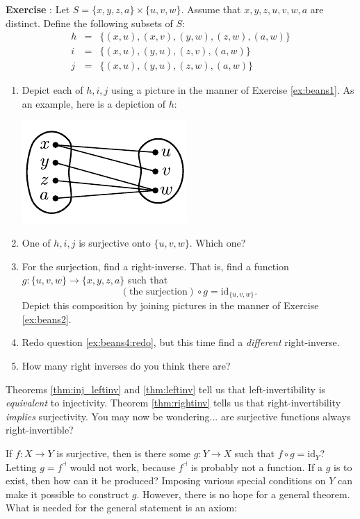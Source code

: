 \documentclass[12pt]{article}
\newcommand{\rev}[1]{{#1}^{\dashv}}
\newcommand{\id}[1]{\textrm{id}_{#1}}
\newcounter{exercise}
\newcounter{theorem}
\def\putExerciseHeading{\refstepcounter{exercise} \textbf{Exercise \theexercise}}
\newcommand{\ex}[1]{ \putExerciseHeading: #1}
\begin{document}
\ex{\label{ex:beans4}Let
$S=\{x,y,z,a\}\times\{u,v,w\}$.
Assume that $x,y,z,u,v,w,a$ are distinct.
Define the following subsets of $S$:
$$\begin{array}{lll}
h&=&\{
(x,u),(x,v),(y,w),(z,w),(a,w)
\}\\
i&=&\{
(x,u),(y,u),(z,v),(a,w)
\}\\
j&=&\{
(x,u),(y,u),(z,w),(a,w)
\}
\end{array}$$
\begin{enumerate}
\item Depict each of $h,i,j$ using a picture in the manner of Exercise \ref{ex:beans1}.
As an example, here is a depiction of $h$:
\begin{center}
\includegraphics[scale=1]{img/beans/beans6.pdf}
\end{center}
\item One of $h,i,j$ is surjective onto $\{u,v,w\}$.
Which one?
\item\label{ex:beans4:redo}
For the surjection, find a right-inverse.
That is, find a function $g:\{u,v,w\}\rightarrow\{x,y,z,a\}$ such that
$$ (\text{the surjection})\circ g = \id{\{u,v,w\}}. $$
Depict this composition by joining pictures in the manner of Exercise \ref{ex:beans2}.
\item
Redo question \ref{ex:beans4:redo}, but this time find a \emph{different} right-inverse.
\item How many right inverses do you think there are?
\end{enumerate}
}

\vspace{2em}

Theorems \ref{thm:inj_leftinv} and \ref{thm:leftinv} tell us
that left-invertibility is \emph{equivalent} to injectivity.
Theorem \ref{thm:rightinv} tells us that right-invertibility \emph{implies} surjectivity.
You may now be wondering... are surjective functions always right-invertible?

If $f:X\rightarrow Y$ is surjective, then is there some $g:Y\rightarrow X$ such that $f\circ g=\id{Y}$?
Letting $g=\rev{f}$ would not work, because $\rev{f}$ is probably not a function.
If a $g$ is to exist, then how can it be produced?
Imposing various special conditions on $Y$ can make it possible to construct $g$.
However, there is no hope for a general theorem. What is needed for the general statement is an axiom:
\end{document}
